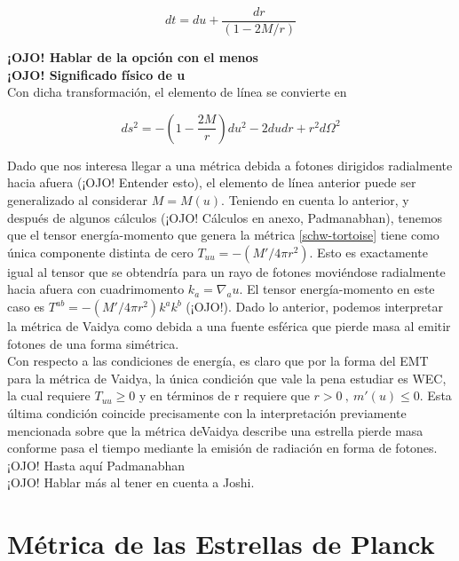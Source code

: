\documentclass{article}
\numberwithin{equation}{section}
\begin{document}
\begin{equation}
dt = du + \frac{dr}{(1 - 2M/r)}
\end{equation}

\textbf{¡OJO! Hablar de la opción con el menos}\\

\textbf{¡OJO! Significado físico de u}\\

Con dicha transformación, el elemento de línea se convierte en 

\begin{equation}
\label{schw-tortoise}
ds^2 = - \left(1- \frac{2M}{r}\right)du^2 - 2dudr + r^2d\Omega^2
\end{equation}

Dado que nos interesa llegar a una métrica debida a fotones dirigidos radialmente hacia afuera (¡OJO! Entender esto), el elemento de línea anterior puede ser generalizado al considerar $M = M(u)$. Teniendo en cuenta lo anterior, y después de algunos cálculos (¡OJO! Cálculos en anexo, Padmanabhan), tenemos que el tensor energía-momento que genera la métrica \eqref{schw-tortoise} tiene como única componente distinta de cero $T_{uu} = -(M'/4 \pi r^2)$. Esto es exactamente igual al tensor que se obtendría para un rayo de fotones moviéndose radialmente hacia afuera con cuadrimomento $k_{a} = \nabla_{a}u$. El tensor energía-momento en este caso es $T^{ab} = -(M'/4 \pi r^2)k^{a}k^{b}$ (¡OJO!). Dado lo anterior, podemos interpretar la métrica de Vaidya como debida a una fuente esférica que pierde masa al emitir fotones de una forma simétrica.\\

Con respecto a las condiciones de energía, es claro que por la forma del EMT para la métrica de Vaidya, la única condición que vale la pena estudiar es WEC, la cual requiere $T_{uu} \geq 0$ y en términos de r requiere que $r > 0\ ,\ m'(u)\leq 0 $. Esta última condición coincide precisamente con la interpretación previamente mencionada sobre que la métrica deVaidya describe una estrella pierde masa conforme pasa el tiempo mediante la emisión de radiación en forma de fotones.\\

¡OJO! Hasta aquí Padmanabhan\\

¡OJO! Hablar más al tener en cuenta a Joshi.\\

\section{\label{metric planck stars} Métrica de las Estrellas de Planck}
\end{document}
